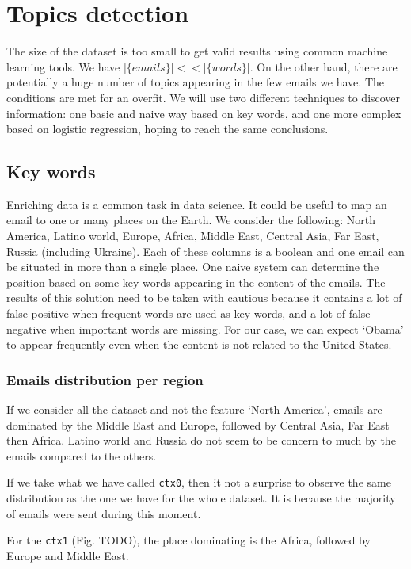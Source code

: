 \documentclass[11pt]{article}
\begin{document}
\section{Topics detection}

The size of the dataset is too small to get valid results using common machine learning tools. We have $|\{ emails \}| << |\{ words \}|$. On the other hand, there are potentially a huge number of topics appearing in the few emails we have. The conditions are met for an overfit. We will use two different techniques to discover information: one basic and naive way based on key words, and one more complex based on logistic regression, hoping to reach the same conclusions.

\subsection{Key words}

Enriching data is a common task in data science. It could be useful to map an email to one or many places on the Earth. We consider the following: North America, Latino world, Europe, Africa, Middle East, Central Asia, Far East, Russia (including Ukraine). Each of these columns is a boolean and one email can be situated in more than a single place. One naive system can determine the position based on some key words appearing in the content of the emails. The results of this solution need to be taken with cautious because it contains a lot of false positive when frequent words are used as key words, and a lot of false negative when important words are missing. For our case, we can expect `Obama' to appear frequently even when the content is not related to the United States.

\subsubsection{Emails distribution per region}

If we consider all the dataset and not the feature `North America', emails are dominated by the Middle East and Europe, followed by Central Asia, Far East then Africa. Latino world and Russia do not seem to be concern to much by the emails compared to the others.

If we take what we have called \texttt{ctx0}, then it not a surprise to observe the same distribution as the one we have for the whole dataset. It is because the majority of emails were sent during this moment.

For the \texttt{ctx1} (Fig. TODO), the place dominating is the Africa, followed by Europe and Middle East.
\end{document}
